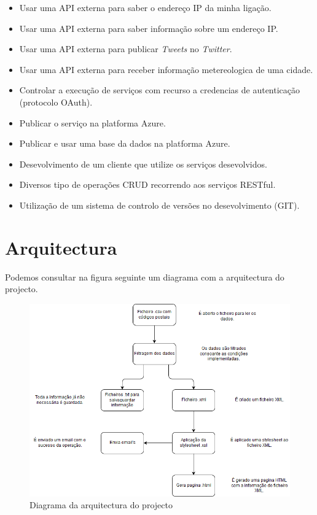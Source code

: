 \documentclass[11pt]{report}
\begin{document}
\begin{itemize}
\item Usar uma API externa para saber o endereço IP da minha ligação.
\item Usar uma API externa para saber informação sobre um endereço IP.
\item Usar uma API externa para publicar \textit{Tweets} no \textit{Twitter}.
\item Usar uma API externa para receber informação metereologica de uma cidade.
\item Controlar a execução de serviços com recurso a credencias de autenticação (protocolo OAuth).
\item Publicar o serviço na platforma Azure.
\item Publicar e usar uma base da dados na platforma Azure.
\item Desevolvimento de um cliente que utilize os serviços desevolvidos.
\item Diversos tipo de operações CRUD recorrendo aos serviços RESTful.
\item Utilização de um sistema de controlo de versões no desevolvimento (GIT).
\end{itemize}


\clearpage


\chapter*{Arquitectura}

Podemos consultar na figura seguinte um diagrama com a arquitectura do projecto.

\begin{figure} [!h]
\centering
\includegraphics[width=\textwidth]{Prints_Trabalho/diagrama}
\caption{Diagrama da arquitectura do projecto}
\label{Rotulo}
\end{figure}
\end{document}
